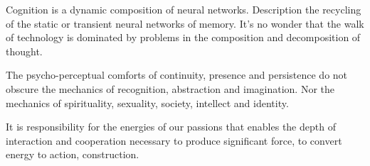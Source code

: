 

Cognition is a dynamic composition of neural networks.  Description
the recycling of the static or transient neural networks of memory.
It's no wonder that the walk of technology is dominated by problems in
the composition and decomposition of thought.

The psycho-perceptual comforts of continuity, presence and persistence
do not obscure the mechanics of recognition, abstraction and
imagination.  Nor the mechanics of spirituality, sexuality, society,
intellect and identity.

It is responsibility for the energies of our passions that enables the
depth of interaction and cooperation necessary to produce significant
force, to convert energy to action, construction.

\bye
